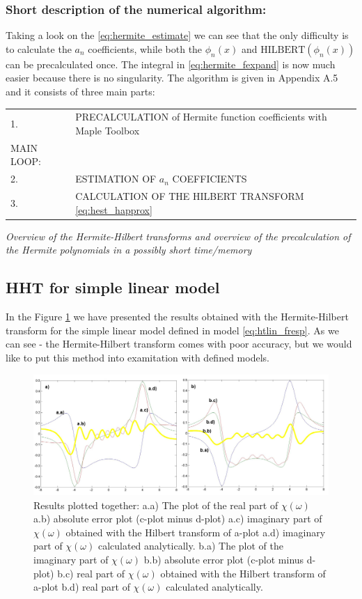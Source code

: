 \documentclass[12pt,twoside,a4paper]{article}
\numberwithin{equation}{subsection}
\numberwithin{figure}{subsection}
\begin{document}
\subsubsection*{Short description of the numerical algorithm:}

Taking a look on the \ref{eq:hermite_estimate} we can see that the only difficulty is to calculate the ${a_{n}}$ coefficients,
while both the ${\phi_{n}}(x)$ and $\mathrm{HILBERT}({\phi_{n}}(x))$ can be precalculated once. The integral in
\ref{eq:hermite_fexpand} is now much easier because there is no singularity. The algorithm is given in Appendix A.5 and it
consists of three main parts:


\begin{tabular}{l l}
  1. &PRECALCULATION of Hermite function coefficients with Maple Toolbox \\
  MAIN LOOP: & \\
  2. &ESTIMATION OF ${a_{n}}$ COEFFICIENTS \\
  3. &CALCULATION OF THE HILBERT TRANSFORM \ref{eq:hest_happrox} \\
\end{tabular}

\textit{Overview of the Hermite-Hilbert transforms and overview of the precalculation of the Hermite polynomials in a possibly short
time/memory}

\subsection{HHT for simple linear model} \label{chap:hermite_lin}

In the Figure \ref{fig:hht_lin} we have presented the results obtained with the Hermite-Hilbert transform for the simple
linear model defined in model \ref{eq:htlin_fresp}. As we can see - the Hermite-Hilbert transform comes with poor accuracy, but we
would like to put this method into examitation with defined models.

\begin{figure} 
  \includegraphics[width=150mm]{img/hht_lin.png}
  \caption{Results plotted together: 
   a.a) The plot of the real part of $\chi (\omega )$ 
   a.b) absolute error plot (c-plot minus d-plot) 
   a.c) imaginary part of $\chi (\omega )$ obtained with the Hilbert transform of a-plot 
   a.d) imaginary part of $\chi (\omega )$  calculated analytically. 
   b.a) The plot of the imaginary part of $\chi (\omega )$ 
   b.b) absolute error plot (c-plot minus d-plot) 
   b.c) real part of $\chi (\omega )$ obtained with the Hilbert transform of a-plot 
   b.d) real part of $\chi (\omega )$ calculated analytically. \label{fig:hht_lin}
  }
\end{figure}
\end{document}
